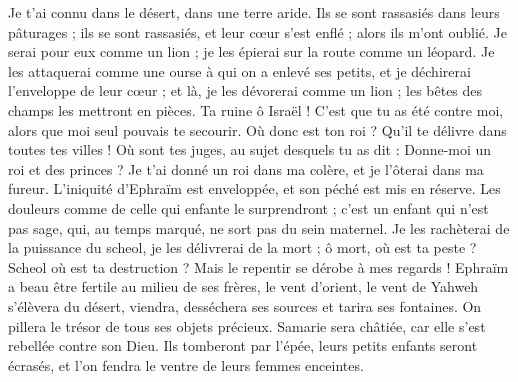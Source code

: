 \begin{multicols}{2}
Je t'ai connu dans le désert, dans une terre aride.
Ils se sont rassasiés dans leurs pâturages ; ils se sont rassasiés, et leur cœur s'est enflé ; alors ils m'ont oublié.
Je serai pour eux comme un lion ; je les épierai sur la route comme un léopard.
Je les attaquerai comme une ourse à qui on a enlevé ses petits, et je déchirerai l’enveloppe de leur cœur ; et là, je les dévorerai comme un lion ; les bêtes des champs les mettront en pièces.
Ta ruine ô Israël ! C’est que tu as été contre moi, alors que moi seul pouvais te secourir.
Où donc est ton roi ? Qu'il te délivre dans toutes tes villes ! Où sont tes juges, au sujet desquels tu as dit : Donne-moi un roi et des princes ?
Je t'ai donné un roi dans ma colère, et je l'ôterai dans ma fureur.
L'iniquité d'Ephraïm est enveloppée, et son péché est mis en réserve.
Les douleurs comme de celle qui enfante le surprendront ; c'est un enfant qui n'est pas sage, qui, au temps marqué, ne sort pas du sein maternel.
Je les rachèterai de la puissance du scheol, je les délivrerai de la mort ; ô mort, où est ta peste ? Scheol où est ta destruction ? Mais le repentir se dérobe à mes regards !
Ephraïm a beau être fertile au milieu de ses frères, le vent d’orient, le vent de Yahweh s’élèvera du désert, viendra, desséchera ses sources et tarira ses fontaines. On pillera le trésor de tous ses objets précieux.
Samarie sera châtiée, car elle s'est rebellée contre son Dieu. Ils tomberont par l'épée, leurs petits enfants seront écrasés, et l’on fendra le ventre de leurs femmes enceintes.

\end{multicols}
